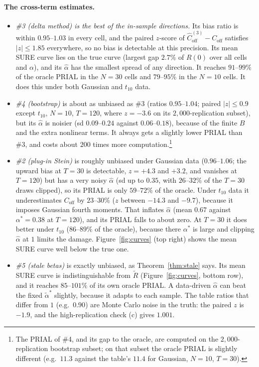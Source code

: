\documentclass[11pt]{article}
\theoremstyle{remark}
\begin{document}
\paragraph{The cross-term estimates.}
\begin{itemize}
  \item \emph{\#3 (delta method) is the best of the in-sample directions.} Its bias ratio is within $0.95$--$1.03$ in every cell, and the paired $z$-score of $\hat C^{(3)}_{\mathrm{off}} - C_{\mathrm{off}}$ satisfies $|z| \le 1.85$ everywhere, so no bias is detectable at this precision. Its mean SURE curve lies on the true curve (largest gap $2.7\%$ of $R(0)$ over all cells and $\alpha$), and its $\hat\alpha$ has the smallest spread of any direction. It reaches $91$--$99\%$ of the oracle PRIAL in the $N = 30$ cells and $79$--$95\%$ in the $N = 10$ cells. It does this under both Gaussian and $t_{10}$ data.
  \item \emph{\#4 (bootstrap)} is about as unbiased as \#3 (ratios $0.95$--$1.04$; paired $|z| \le 0.9$ except $t_{10}$, $N = 10$, $T = 120$, where $z = -3.6$ on its $2{,}000$-replication subset), but its $\hat\alpha$ is noisier (sd $0.09$--$0.24$ against $0.06$--$0.18$), because of the finite $B$ and the extra nonlinear terms. It always gets a slightly lower PRIAL than \#3, and costs about $200$ times more computation.\footnote{The PRIAL of \#4, and its gap to the oracle, are computed on the $2{,}000$-replication bootstrap subset; on that subset the oracle PRIAL is slightly different (e.g.\ $11.3$ against the table's $11.4$ for Gaussian, $N = 10$, $T = 30$).}
  \item \emph{\#2 (plug-in Stein)} is roughly unbiased under Gaussian data ($0.96$--$1.06$; the upward bias at $T = 30$ is detectable, $z = +4.3$ and $+3.2$, and vanishes at $T = 120$) but has a very noisy $\hat\alpha$ (sd up to $0.35$, with $26$--$32\%$ of the $T = 30$ draws clipped), so its PRIAL is only $59$--$72\%$ of the oracle. Under $t_{10}$ data it underestimates $C_{\mathrm{off}}$ by $23$--$30\%$ ($z$ between $-14.3$ and $-9.7$), because it imposes Gaussian fourth moments. That inflates $\hat\alpha$ (mean $0.67$ against $\alpha^* = 0.38$ at $T = 120$), and its PRIAL falls to about zero. At $T = 30$ it does better under $t_{10}$ ($86$--$89\%$ of the oracle), because there $\alpha^*$ is large and clipping $\hat\alpha$ at $1$ limits the damage. Figure~\ref{fig:curves} (top right) shows the mean SURE curve well below the true one.
  \item \emph{\#5 (stale betas)} is exactly unbiased, as Theorem~\ref{thm:stale} says. Its mean SURE curve is indistinguishable from $\tilde R$ (Figure~\ref{fig:curves}, bottom row), and it reaches $85$--$101\%$ of its own oracle PRIAL. A data-driven $\hat\alpha$ can beat the fixed $\tilde\alpha^*$ slightly, because it adapts to each sample. The table ratios that differ from $1$ (e.g.\ $0.90$) are Monte Carlo noise in the truth: the paired $z$ is $-1.9$, and the high-replication check (c) gives $1.001$.
\end{itemize}
\end{document}
